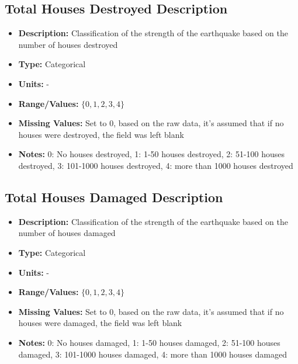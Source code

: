 \documentclass{article}
\begin{document}
\subsection{Total Houses Destroyed Description}
\begin{itemize}
    \item \textbf{Description:} Classification of the strength of the earthquake based on the number of houses destroyed
    \item \textbf{Type:} Categorical
    \item \textbf{Units:} -
    \item \textbf{Range/Values:} $\{0,1,2,3,4 \}$
    \item \textbf{Missing Values:} Set to 0, based on the raw data, it's assumed that if no houses were destroyed, the field was left blank
    \item \textbf{Notes:} 0: No houses destroyed, 1: 1-50 houses destroyed, 2: 51-100 houses destroyed, 3: 101-1000 houses destroyed, 4: more than 1000 houses destroyed
\end{itemize}

\subsection{Total Houses Damaged Description}
\begin{itemize}
    \item \textbf{Description:} Classification of the strength of the earthquake based on the number of houses damaged
    \item \textbf{Type:} Categorical
    \item \textbf{Units:} -
    \item \textbf{Range/Values:} $\{0,1,2,3,4 \}$
    \item \textbf{Missing Values:} Set to 0, based on the raw data, it's assumed that if no houses were damaged, the field was left blank
    \item \textbf{Notes:} 0: No houses damaged, 1: 1-50 houses damaged, 2: 51-100 houses damaged, 3: 101-1000 houses damaged, 4: more than 1000 houses damaged
\end{itemize}

\end{document}
